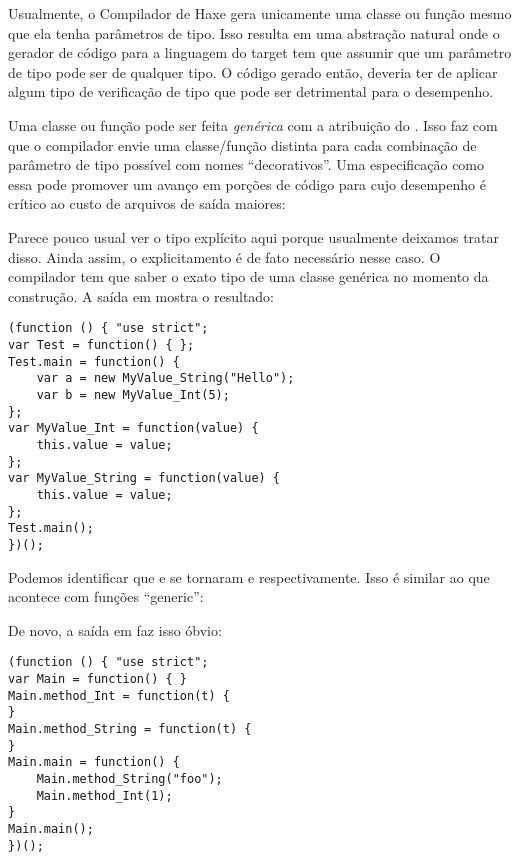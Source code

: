 Usualmente, o Compilador de Haxe gera unicamente uma classe ou função mesmo que ela tenha parâmetros de tipo. Isso resulta em uma abstração natural onde o gerador de código para a linguagem do target tem que assumir que um parâmetro de tipo pode ser de qualquer tipo. O código gerado então, deveria ter de aplicar algum tipo de verificação de tipo que pode ser detrimental para o desempenho.

Uma classe ou função pode ser feita \emph{genérica} com a atribuição do  . Isso faz com que o compilador envie uma classe/função distinta para cada combinação de parâmetro de tipo possível com nomes ``decorativos''. Uma especificação como essa pode promover um avanço em porções de código para  cujo desempenho é crítico ao custo de arquivos de saída maiores:


Parece pouco usual ver o tipo explícito  aqui porque usualmente deixamos  tratar disso. Ainda assim, o explicitamento é de fato necessário nesse caso. O compilador tem que saber o exato tipo de uma classe genérica no momento da construção. A saída em  mostra o resultado:

\begin{lstlisting}
(function () { "use strict";
var Test = function() { };
Test.main = function() {
	var a = new MyValue_String("Hello");
	var b = new MyValue_Int(5);
};
var MyValue_Int = function(value) {
	this.value = value;
};
var MyValue_String = function(value) {
	this.value = value;
};
Test.main();
})();
\end{lstlisting}

Podemos identificar que  e  se tornaram  e  respectivamente. Isso é similar ao que acontece com funções ``generic'':


De novo, a saída em  faz isso óbvio:

\begin{lstlisting}
(function () { "use strict";
var Main = function() { }
Main.method_Int = function(t) {
}
Main.method_String = function(t) {
}
Main.main = function() {
	Main.method_String("foo");
	Main.method_Int(1);
}
Main.main();
})();
\end{lstlisting}


